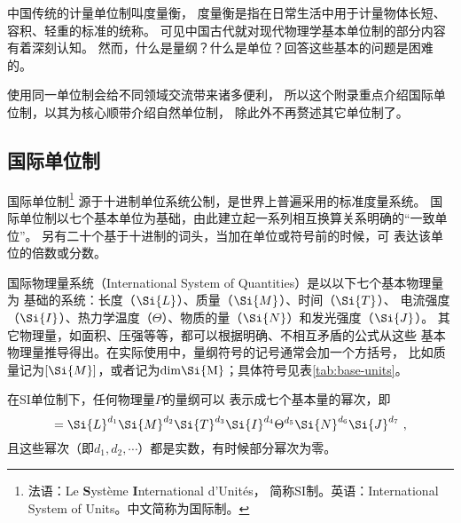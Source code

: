 中国传统的计量单位制叫度量衡，
度量衡是指在日常生活中用于计量物体长短、容积、轻重的标准的统称。
可见中国古代就对现代物理学基本单位制的部分内容有着深刻认知。
然而，什么是量纲？什么是单位？回答这些基本的问题是困难的。

使用同一单位制会给不同领域交流带来诸多便利，
所以这个附录重点介绍国际单位制，以其为核心顺带介绍自然单位制，
除此外不再赘述其它单位制了。

\subsection{国际单位制}
国际单位制{\footnote{法语：Le {\bf S}ystème {\bf I}nternational d'Unités，
        简称SI制。英语：International System of Units。中文简称为国际制。}}
源于十进制单位系统{\kaishu 公制}，是世界上普遍采用的标准度量系统。 
国际单位制以七个基本单位为基础，由此建立起一系列相互换算关系明确的“一致单位”。
另有二十个基于十进制的词头，当加在单位或符号前的时候，可
表达该单位的倍数或分数。


国际物理量系统（International System of Quantities）是以以下七个基本物理量为
基础的系统：长度（$\Si{L}$）、质量（$\Si{M}$）、时间（$\Si{T}$）、
电流强度（$\Si{I}$）、热力学温度（$\Theta$）、物质的量（$\Si{N}$）和发光强度（$\Si{J}$）。
其它物理量，如面积、压强等等，都可以根据明确、不相互矛盾的公式从这些
基本物理量推导得出。在实际使用中，量纲符号的记号通常会加一个方括号，
比如质量记为$[\Si{M}]$，或者记为$\rm{dim} \Si{M}$；具体符号见表\ref{tab:base-units}。


在SI单位制下，任何物理量$P$的量纲可以
表示成七个基本量的幂次，即
\begin{equation} %
[P]=\Si{L}^{d_1} \Si{M}^{d_2} \Si{T}^{d_3} \Si{I}^{d_4} \Theta^{d_5} \Si{N}^{d_6} \Si{J}^{d_7}~,
\end{equation}
且这些幂次（即$d_1,d_2,\cdots$）都是实数，有时候部分幂次为零。
